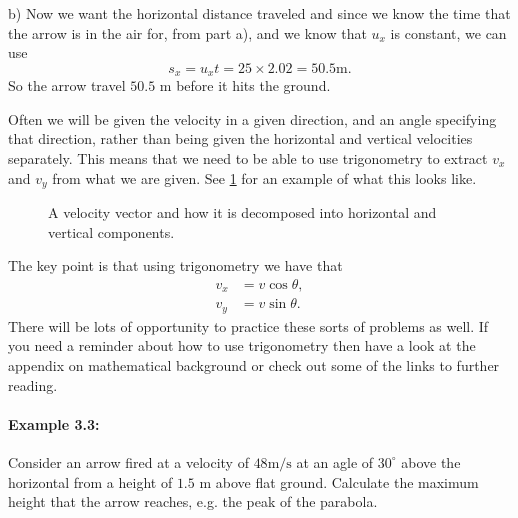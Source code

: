 \documentclass[a4paper,12pt]{book}
\begin{document}
b) Now we want the horizontal distance traveled and since we know the time that the arrow is in the air for, from part a), and we know that $u_{x}$ is constant, we can use 
\begin{equation*}
s_{x}=u_{x}t=25\times 2.02=50.5\text{m}.
\end{equation*}
So the arrow travel $50.5$ m before it hits the ground.

Often we will be given the velocity in a given direction, and an angle specifying that direction, rather than being given the horizontal and vertical velocities separately. This means that we need to be able to use trigonometry to extract $v_{x}$ and $v_{y}$ from what we are given. See \cref{fig: velocity components} for an example of what this looks like. 
\begin{figure}[ht]
    \centering
    \caption{A velocity vector and how it is decomposed into horizontal and vertical components.}
    \label{fig: velocity components}
\end{figure}

The key point is that using trigonometry we have that
\begin{align*}
v_{x}&=v\cos\theta,\\
v_{y}&=v\sin\theta.
\end{align*}
There will be lots of opportunity to practice these sorts of problems as well. If you need a reminder about how to use trigonometry then have a look at the appendix on mathematical background or check out some of the links to further reading.

\paragraph{Example 3.3:} Consider an arrow fired at a velocity of $48\text{m/s}$ at an agle of $30^{\circ}$ above the horizontal from a height of $1.5$ m above flat ground. Calculate the maximum height that the arrow reaches, e.g. the peak of the parabola.\\
\end{document}
